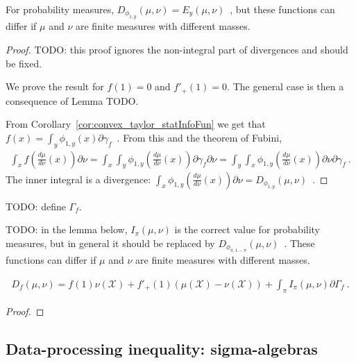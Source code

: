 For probability measures, $D_{\phi_{1,y}}(\mu, \nu) = E_y(\mu, \nu)$~, but these functions can differ if $\mu$ and $\nu$ are finite measures with different masses.

\begin{proof}%
{}
TODO: this proof ignores the non-integral part of divergences and should be fixed.

We prove the result for $f(1) = 0$ and $f'_+(1) = 0$. The general case is then a consequence of Lemma TODO.

From Corollary~\ref{cor:convex_taylor_statInfoFun} we get that $f(x) = \int_y \phi_{1,y}(x) \partial\gamma_f$~.
From this and the theorem of Fubini,
\begin{align*}
\int_x f\left( \frac{d \mu}{d \nu}(x) \right) \partial\nu
= \int_{x} \int_{y} \phi_{1,y} \left(\frac{d \mu}{d \nu}(x) \right) \partial\gamma_f \partial\nu
= \int_{y} \int_{x} \phi_{1,y} \left(\frac{d \mu}{d \nu}(x) \right) \partial\nu \partial\gamma_f
\: .
\end{align*}
The inner integral is a divergence: $\int_{x} \phi_{1,y} \left(\frac{d \mu}{d \nu}(x) \right) \partial\nu = D_{\phi_{1,y}}(\mu, \nu)$~.
\end{proof}

TODO: define $\Gamma_f$.

TODO: in the lemma below, $I_\pi(\mu, \nu)$ is the correct value for probability measures, but in general it should be replaced by $D_{\phi_{\pi, 1 - \pi}}(\mu, \nu)$~.
These functions can differ if $\mu$ and $\nu$ are finite measures with different masses.

\begin{theorem}
  \label{thm:fDiv_eq_integral}
  \begin{align*}
  D_f(\mu, \nu) = f(1) \nu(\mathcal X) + f'_+(1)(\mu(\mathcal X) - \nu(\mathcal X)) + \int_\pi I_\pi(\mu, \nu) \partial\Gamma_f \: .
  \end{align*}
  
\end{theorem}

\begin{proof}%
{}

\end{proof}



\subsection{Data-processing inequality: sigma-algebras}

